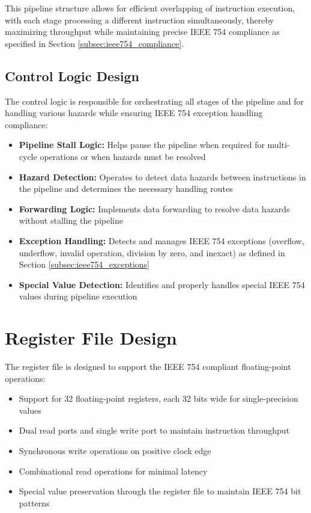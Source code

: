This pipeline structure allows for efficient overlapping of instruction execution, with each stage processing a different instruction simultaneously, thereby maximizing throughput while maintaining precise IEEE 754 compliance as specified in Section \ref{subsec:ieee754_compliance}.

\subsection{Control Logic Design}
\label{subsec:control_logic}

The control logic is responsible for orchestrating all stages of the pipeline and for handling various hazards while ensuring IEEE 754 exception handling compliance:

\begin{itemize}
\item \textbf{Pipeline Stall Logic:} Helps pause the pipeline when required for multi-cycle operations or when hazards must be resolved
\item \textbf{Hazard Detection:} Operates to detect data hazards between instructions in the pipeline and determines the necessary handling routes
\item \textbf{Forwarding Logic:} Implements data forwarding to resolve data hazards without stalling the pipeline
\item \textbf{Exception Handling:} Detects and manages IEEE 754 exceptions (overflow, underflow, invalid operation, division by zero, and inexact) as defined in Section \ref{subsec:ieee754_exceptions}
\item \textbf{Special Value Detection:} Identifies and properly handles special IEEE 754 values during pipeline execution
\end{itemize}



\section{Register File Design}
\label{sec:register_file}

The register file is designed to support the IEEE 754 compliant floating-point operations:

\begin{itemize}
\item Support for 32 floating-point registers, each 32 bits wide for single-precision values
\item Dual read ports and single write port to maintain instruction throughput
\item Synchronous write operations on positive clock edge
\item Combinational read operations for minimal latency
\item Special value preservation through the register file to maintain IEEE 754 bit patterns
\end{itemize}

